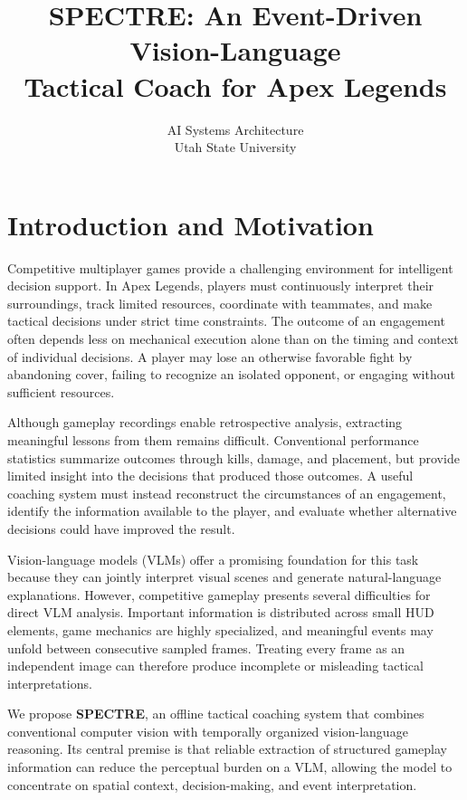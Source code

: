 \documentclass[10pt,letterpaper]{article}
\title{\vspace{-1.5em}\textbf{SPECTRE: An Event-Driven Vision-Language\\
Tactical Coach for Apex Legends}}
\author{AI Systems Architecture \\ Utah State University}
\date{}
\begin{document}
\maketitle
\vspace{-2em}

\section{Introduction and Motivation}

Competitive multiplayer games provide a challenging environment for
intelligent decision support. In Apex Legends, players must continuously
interpret their surroundings, track limited resources, coordinate with
teammates, and make tactical decisions under strict time constraints.
The outcome of an engagement often depends less on mechanical execution
alone than on the timing and context of individual decisions. A player
may lose an otherwise favorable fight by abandoning cover, failing to
recognize an isolated opponent, or engaging without sufficient resources.

Although gameplay recordings enable retrospective analysis, extracting
meaningful lessons from them remains difficult. Conventional performance
statistics summarize outcomes through kills, damage, and placement, but
provide limited insight into the decisions that produced those outcomes.
A useful coaching system must instead reconstruct the circumstances of
an engagement, identify the information available to the player, and
evaluate whether alternative decisions could have improved the result.

Vision-language models (VLMs) offer a promising foundation for this
task because they can jointly interpret visual scenes and generate
natural-language explanations. However, competitive gameplay presents
several difficulties for direct VLM analysis. Important information is
distributed across small HUD elements, game mechanics are highly
specialized, and meaningful events may unfold between consecutive
sampled frames. Treating every frame as an independent image can
therefore produce incomplete or misleading tactical interpretations.

We propose \textbf{SPECTRE}, an offline tactical coaching system that
combines conventional computer vision with temporally organized
vision-language reasoning. Its central premise is that reliable
extraction of structured gameplay information can reduce the perceptual
burden on a VLM, allowing the model to concentrate on spatial context,
decision-making, and event interpretation.
\end{document}
